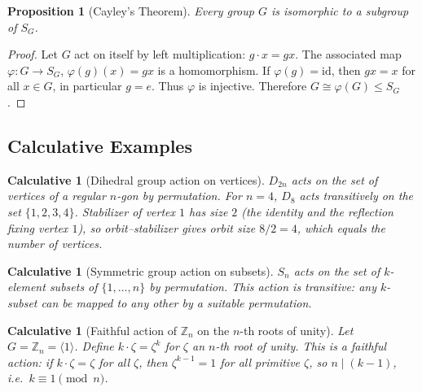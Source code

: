 \documentclass[12pt]{article}
\newtheorem{proposition}[theorem]{Proposition}
\newtheorem{calculative}[theorem]{Calculative}
\theoremstyle{definition}
\begin{document}
\begin{proposition}[Cayley’s Theorem]
Every group $G$ is isomorphic to a subgroup of $S_G$.
\end{proposition}

\begin{proof}
Let $G$ act on itself by left multiplication: $g\cdot x=gx$. The associated map
$\varphi:G\to S_G$, $\varphi(g)(x)=gx$ is a homomorphism. If $\varphi(g)=\mathrm{id}$,
then $gx=x$ for all $x\in G$, in particular $g=e$. Thus $\varphi$ is injective.
Therefore $G\cong \varphi(G)\le S_G$.
\end{proof}

\subsection*{Calculative Examples}

\begin{calculative}[Dihedral group action on vertices]
$D_{2n}$ acts on the set of vertices of a regular $n$-gon by permutation.
For $n=4$, $D_8$ acts transitively on the set $\{1,2,3,4\}$.
Stabilizer of vertex $1$ has size $2$ (the identity and the reflection fixing vertex $1$),
so orbit–stabilizer gives orbit size $8/2=4$, which equals the number of vertices.
\end{calculative}

\begin{calculative}[Symmetric group action on subsets]
$S_n$ acts on the set of $k$-element subsets of $\{1,\dots,n\}$ by permutation.
This action is transitive: any $k$-subset can be mapped to any other by a suitable permutation.
\end{calculative}

\begin{calculative}[Faithful action of $\mathbb{Z}_n$ on the $n$-th roots of unity]
Let $G=\mathbb{Z}_n=\langle 1\rangle$. Define $k\cdot \zeta = \zeta^k$ for $\zeta$ an $n$-th root of unity.
This is a faithful action: if $k\cdot \zeta=\zeta$ for all $\zeta$, then $\zeta^{k-1}=1$ for all primitive $\zeta$,
so $n\mid (k-1)$, i.e.\ $k\equiv 1\pmod n$.
\end{calculative}
\end{document}
